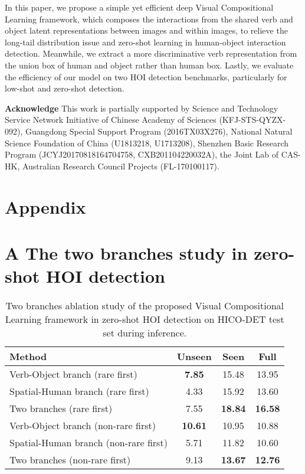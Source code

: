 \documentclass[runningheads]{llncs}
\begin{document}
In this paper, we propose a simple yet efficient deep Visual Compositional Learning framework, which composes the interactions from the shared verb and object latent representations between images and within images, to relieve the long-tail distribution issue and zero-shot learning in human-object interaction detection. Meanwhile, we extract a more discriminative verb representation from the union box of human and object rather than human box. Lastly, we evaluate the efficiency of our model on two HOI detection benchmarks, particularly for low-shot and zero-shot detection.


{\bf Acknowledge} This work is partially supported by Science and Technology Service Network Initiative of Chinese Academy of Sciences (KFJ-STS-QYZX-092), Guangdong Special Support Program (2016TX03X276), National Natural Science Foundation of China (U1813218, U1713208), Shenzhen Basic Research Program (JCYJ20170818164704758, CXB201104220032A), the Joint Lab of CAS-HK, Australian Research Council Projects (FL-170100117).



\clearpage
\section*{Appendix}

\section*{A The two branches study in zero-shot HOI detection}
\label{sec:zero_shot_branches}

\begin{table}
\begin{center}
\caption{Two branches ablation study of the proposed Visual Compositional Learning framework in zero-shot HOI detection on HICO-DET test set during inference.
}
\label{table:branch_zero_shot}
\small
\begin{tabular}{lccc}
\hline
Method & Unseen & Seen & Full \\
\hline\hline
Verb-Object branch (rare first) & {\bf 7.85} & 15.48 & 13.95 \\
Spatial-Human branch (rare first) & 4.33 & 15.92 & 13.60 \\
Two branches (rare first) & 7.55 & {\bf 18.84} & {\bf 16.58} \\
\hline
Verb-Object branch (non-rare first) & {\bf 10.61} & 10.95 & 10.88 \\
Spatial-Human branch (non-rare first) & 5.71 & 11.82 & 10.60 \\
Two branches (non-rare first) & 9.13 & {\bf 13.67}  & {\bf 12.76} \\

\hline
\end{tabular}
\end{center}
\end{table}
\end{document}
